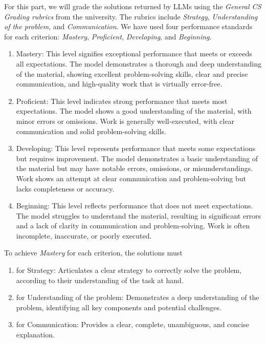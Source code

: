 For this part, we will grade the solutions returned by LLMs using the \textit{General CS Grading rubrics} from the university. The rubrics include \textit{Strategy}, \textit{Understanding of the problem}, and \textit{Communication}. We have used four performance standards for each criterion:  \textit{Mastery},  \textit{Proficient}, \textit{Developing}, and \textit{Beginning}. 



\begin{enumerate}
	\item Mastery: This level signifies exceptional performance that meets or exceeds all
	expectations. The model demonstrates a thorough and deep understanding of the
	material, showing excellent problem-solving skills, clear and precise communication, and
	high-quality work that is virtually error-free.
	
	\item Proficient: This level indicates strong performance that meets most expectations. The
	model shows a good understanding of the material, with minor errors or omissions. Work
	is generally well-executed, with clear communication and solid problem-solving skills.
	
	\item Developing: This level represents performance that meets some expectations but requires improvement. The model demonstrates a basic understanding of the material but may have notable errors, omissions, or misunderstandings. Work shows an attempt at clear communication and problem-solving but lacks completeness or accuracy.
	
	\item Beginning: This level reflects performance that does not meet expectations. The model struggles to understand the material, resulting in significant errors and a lack of clarity in communication and problem-solving. Work is often incomplete, inaccurate, or poorly executed.
\end{enumerate}



To achieve \textit{Mastery} for each criterion, the solutions must


\begin{enumerate}
    \item for Strategy: Articulates a clear strategy to correctly solve the problem, according to their understanding of the task at hand.
    \item for Understanding of the problem: Demonstrates a deep understanding of the problem, identifying all key components and potential challenges.
    \item for Communication: Provides a clear, complete, unambiguous, and concise explanation.
\end{enumerate}

